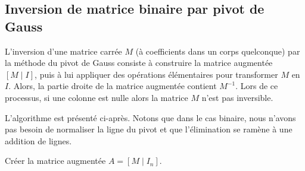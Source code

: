 \documentclass[11pt,a4paper]{article}
\newcommand{\F}{\mathbb{F}_2}
\begin{document}
%

\subsection{Inversion de matrice binaire par pivot de Gauss}

L'inversion d'une matrice carrée $M$ (à coefficients dans un corps quelconque)
par la méthode du pivot de Gauss consiste à construire la matrice augmentée $[M
\mid I]$, puis à lui appliquer des opérations élémentaires pour transformer $M$ en
$I$. Alors, la partie droite de la matrice augmentée contient $M^{-1}$.
Lors de ce processus, si une colonne est nulle alors la matrice $M$ n'est pas
inversible.

L'algorithme est présenté ci-après. Notons que dans le cas binaire, nous n'avons
pas besoin de normaliser la ligne du pivot et que l'élimination se ramène à une
addition de lignes.

\begin{algorithm}[H]
\DontPrintSemicolon
\Entree{Matrice $M \in \F^{n\times n}$.}
Créer la matrice augmentée $A = [M \mid I_n]$.\;
\;
\caption{Inversion de matrice binaire par le pivot de Gauss}
\end{algorithm}
\end{document}
